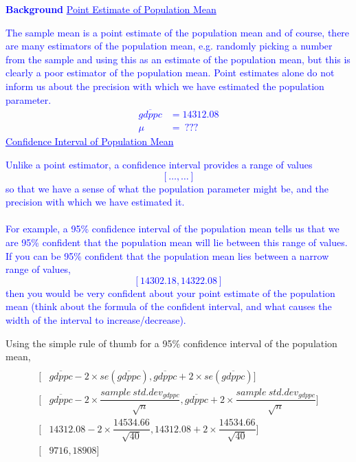 \documentclass[12pt]{report}
\newenvironment{blueframed}[1][blue]
{\def\FrameCommand{\fboxsep=\FrameSep\fcolorbox{#1}{white}}%
\MakeFramed {\advance\hsize-\width \FrameRestore}}
{\endMakeFramed}
\begin{document}
\justify
\begin{blueframed}
	\textcolor{blue}{\textbf{Background}}
	\vspace{-\baselineskip}
	\justify
	\textcolor{blue}{\underline{Point Estimate of Population Mean}}
	
	\noindent \textcolor{blue}
	{
		The sample mean is a point estimate of the population mean and of course, there are many estimators of the population mean, e.g. randomly picking a number from the sample and using this as an estimate of the population mean, but this is clearly a poor estimator of the population mean. Point estimates alone do not inform us about the precision with which we have estimated the population parameter. \begin{align*}
		 \overline{gdppc} &= 14312.08 \\
		 \mu &=\ ???
		\end{align*} \underline{Confidence Interval of Population Mean}
	}
	
	\noindent \textcolor{blue}
	{
		Unlike a point estimator, a confidence interval provides a range of values $$[\dots,\dots]$$ so that we have a sense of what the population parameter might be, and the precision with which we have estimated it. \\ \\ For example, a 95\% confidence interval of the population mean tells us that we are 95\% confident that the population mean will lie between this range of values. If you can be 95\% confident that the population mean lies between a narrow range of values, $$[14302.18,14322.08]$$ then you would be very confident about your point estimate of the population mean (think about the formula of the confident interval, and what causes the width of the interval to increase/decrease). 
	}
\end{blueframed}

\newpage
\noindent Using the simple rule of thumb for a 95\% confidence interval of the population mean, 
\begin{align*}
	[&\overline{gdppc} \pm 2 \times se(\overline{gdppc})] \\
	[&\overline{gdppc} - 2 \times se(\overline{gdppc}), \overline{gdppc} + 2 \times se(\overline{gdppc})] \\
	[&\overline{gdppc} - 2 \times \dfrac{sample\ std.dev_{gdppc}}{\sqrt{n}}, \overline{gdppc} + 2 \times \dfrac{sample\ std.dev_{gdppc}}{\sqrt{n}}] \\
	[&14312.08 - 2 \times \dfrac{14534.66}{\sqrt{40}}, 14312.08 + 2 \times \dfrac{14534.66}{\sqrt{40}}] \\
	[&9716,18908]
\end{align*}
\end{document}
